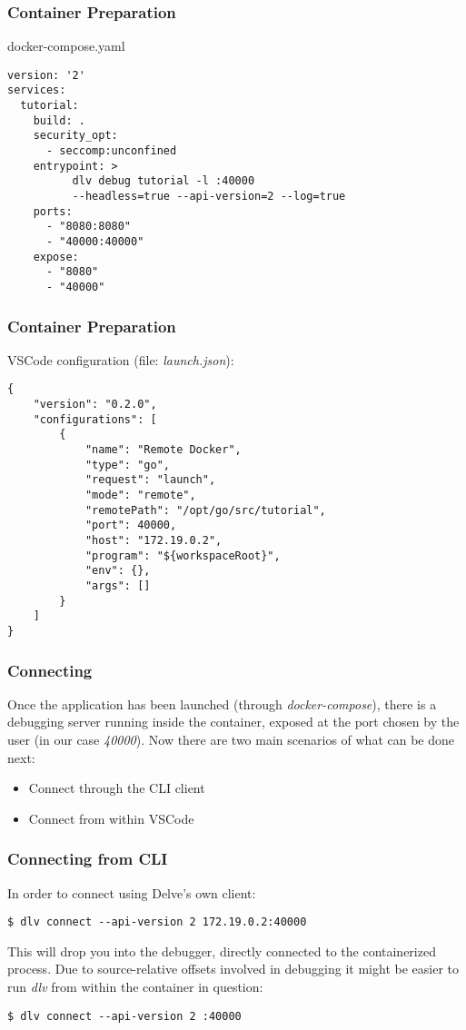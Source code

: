 \documentclass[pdf,xcolor=dvipsnames,noparindent]{beamer}
\begin{document}
\begin{frame}[fragile]
	\frametitle{Container Preparation}
	docker-compose.yaml
	\begin{lstlisting}
version: '2'
services:
  tutorial:
    build: .
    security_opt:
      - seccomp:unconfined
    entrypoint: >
          dlv debug tutorial -l :40000 
          --headless=true --api-version=2 --log=true
    ports:
      - "8080:8080"
      - "40000:40000"
    expose:
      - "8080"
      - "40000"
	\end{lstlisting}
\end{frame}

\begin{frame}[fragile]
	\frametitle{Container Preparation}
	VSCode configuration (file: \emph{launch.json}):
	\begin{lstlisting}[]
{
    "version": "0.2.0",
    "configurations": [
        {
            "name": "Remote Docker",
            "type": "go",
            "request": "launch",
            "mode": "remote",
            "remotePath": "/opt/go/src/tutorial",
            "port": 40000,
            "host": "172.19.0.2",
            "program": "${workspaceRoot}",
            "env": {},
            "args": []
        }
    ]
}
	\end{lstlisting}
\end{frame}

\begin{frame}
	\frametitle{Connecting}
	Once the application has been launched (through
	\emph{docker-compose}), there is a debugging server running inside
	the container, exposed at the port chosen by the user (in our case
	\emph{40000}).
	\newline
	\newline
	\pause
	Now there are two main scenarios of what can be done next:
	\pause
	\begin{itemize}
		\item Connect through the CLI client
		      \pause
		\item Connect from within VSCode
	\end{itemize}
\end{frame}

\begin{frame}
	\frametitle{Connecting from CLI}
	In order to connect using Delve's own client:
	\begin{verbatim}
$ dlv connect --api-version 2 172.19.0.2:40000
	\end{verbatim}
	\pause This will drop you into the debugger, directly connected to
	the containerized process.
	\pause
	\newline
	Due to source-relative offsets involved in debugging it might be easier to run \emph{dlv} from within the container in question:
	\begin{verbatim}
$ dlv connect --api-version 2 :40000
	\end{verbatim}
\end{frame}
\end{document}
